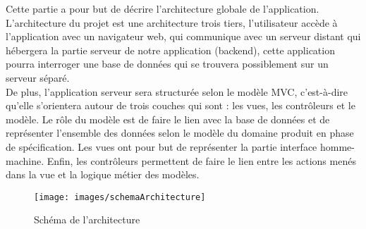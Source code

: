 Cette partie a pour but de décrire l'architecture globale de l'application.\\

L'architecture du projet est une architecture trois tiers, l'utilisateur accède à l'application avec un navigateur web, qui communique avec un serveur distant qui hébergera la partie serveur de notre application (backend), cette application pourra interroger une base de données qui se trouvera possiblement sur un serveur séparé.\\

De plus, l'application serveur sera structurée selon le modèle MVC, c'est-à-dire qu'elle s'orientera autour de trois couches qui sont : les vues, les contrôleurs et le modèle. Le rôle du modèle est de faire le lien avec la base de données et de représenter l'ensemble des données selon le modèle du domaine produit en phase de spécification. Les vues ont pour but de représenter la partie interface homme-machine. Enfin, les contrôleurs permettent de faire le lien entre les actions menés dans la vue et la logique métier des modèles. 


\begin{figure}[!h]
	\begin{center}
	\texttt{[image: images/schemaArchitecture]}
	\caption{\label{archi_schema} Schéma de l'architecture}
	\end{center}
\end{figure}